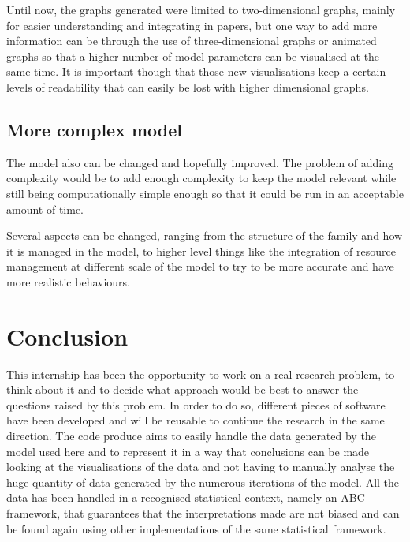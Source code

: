 \documentclass[a4paper,12pt]{report}
\begin{document}
Until now, the graphs generated were limited to two-dimensional graphs, mainly for easier understanding and integrating in papers, but one way to add more information can be through the use of three-dimensional graphs or animated graphs so that a higher number of model parameters can be visualised at the same time. It is important though that those new visualisations keep a certain levels of readability that can easily be lost with higher dimensional graphs.

\section{More complex model}
The model also can be changed and hopefully improved. The problem of adding complexity would be to add enough complexity to keep the model relevant while still being computationally simple enough so that it could be run in an acceptable amount of time.

Several aspects can be changed, ranging from the structure of the family and how it is managed in the model, to higher level things like the integration of resource management at different scale of the model to try to be more accurate and have more realistic behaviours.


\chapter*{Conclusion}

This internship has been the opportunity to work on a real research problem, to think about it and to decide what approach would be best to answer the questions raised by this problem. In order to do so, different pieces of software have been developed and will be reusable to continue the research in the same direction. The code produce aims to easily handle the data generated by the model used here and to represent it in a way that conclusions can be made looking at the visualisations of the data and not having to manually analyse the huge quantity of data generated by the numerous iterations of the model. All the data has been handled in a recognised statistical context, namely an ABC framework, that guarantees that the interpretations made are not biased and can be found again using other implementations of the same statistical framework.




\appendix
\renewcommand{\thesection}{\Roman{section}}
\end{document}
